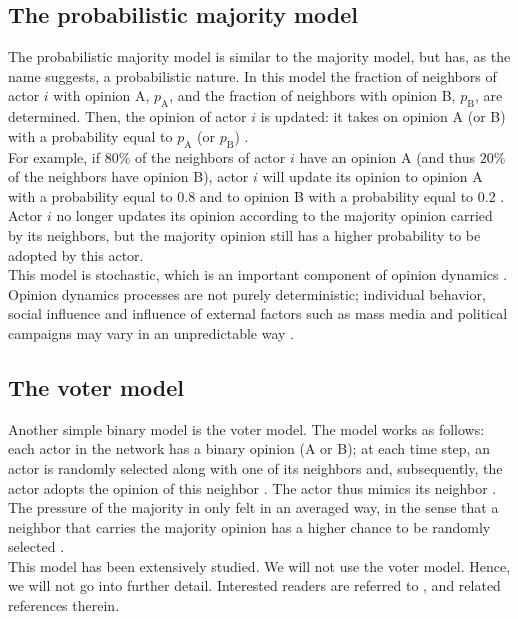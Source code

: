 \documentclass[11 pt , letterpaper , twoside , openright]{book}
\begin{document}
\subsection{The probabilistic majority model}\label{probMaj}

The probabilistic majority model is similar to the majority model, but has, as the name suggests, a probabilistic nature. In this model the fraction of neighbors of actor $i$ with opinion A, $p_\text{A}$, and the fraction of neighbors with opinion B, $p_\text{B}$, are determined. Then, the opinion of actor $i$ is updated: it takes on opinion A (or B) with a probability equal to $p_\text{A}$ (or $p_\text{B}$) \cite{Perra2019}.\\
\newline
For example, if $80\%$ of the neighbors of actor $i$ have an opinion A (and thus $20 \%$ of the neighbors have opinion B), actor $i$ will update its opinion to opinion A with a probability equal to $0.8$ and to opinion B with a probability equal to $0.2$ \cite{Perra2019}. Actor $i$ no longer updates its opinion according to the majority opinion carried by its neighbors, but the majority opinion still has a higher probability to be adopted by this actor.\\
\newline
This model is stochastic, which is an important component of opinion dynamics \cite{Castellano2009}\cite{Perra2019}. Opinion dynamics processes are not purely deterministic; individual behavior, social influence and influence of external factors such as mass media and political campaigns may vary in an unpredictable way \cite{Castellano2009}.

\subsection{The voter model}

Another simple binary model is the voter model. The model works as follows: each actor in the network has a binary opinion (A or B); at each time step, an actor is randomly selected along with one of its neighbors and, subsequently, the actor adopts the opinion of this neighbor \cite{Castellano2009}. The actor thus mimics its neighbor \cite{Castellano2009}. \\
\newline
The pressure of the majority in only felt in an averaged way, in the sense that a neighbor that carries the majority opinion has a higher chance to be randomly selected \cite{Castellano2009}.\\
\newline
This model has been extensively studied. We will not use the voter model. Hence, we will not go into further detail. Interested readers are referred to \cite{Castellano2009}, \cite{Fernandez2014} and related references therein.
\end{document}
